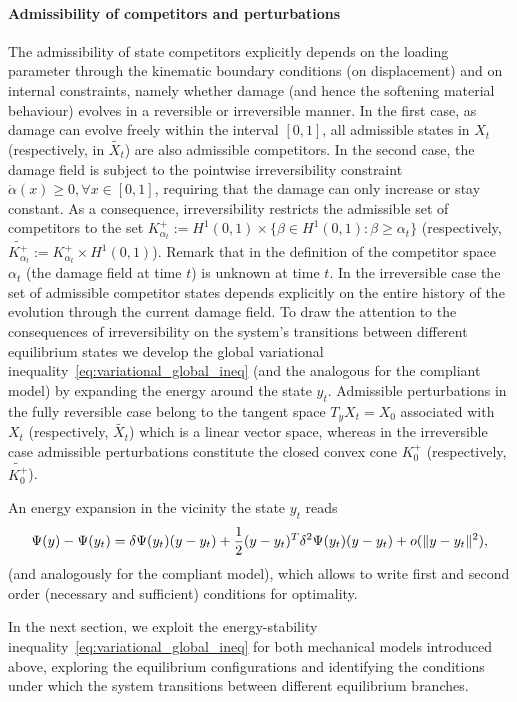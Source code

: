 \paragraph{Admissibility of competitors and perturbations}
The admissibility of state competitors explicitly depends on the loading parameter through the kinematic boundary conditions (on displacement) and on internal constraints, namely whether damage (and hence the softening material behaviour)  evolves in a reversible or irreversible manner.
In the first case, as damage can evolve freely within the interval $[0, 1]$, all admissible states in $X_t$  (respectively, in $\widetilde{X_t}$) are also admissible competitors.
In the second case, the damage field is subject to the pointwise irreversibility constraint $\dot \alpha(x)\geq 0, \forall x\in [0, 1]$, requiring that the damage can only increase or stay constant.
As a consequence, irreversibility restricts the admissible set of competitors to the set $K^+_{\alpha_t}:=H^1(0, 1) \times \{\beta\in H^1(0, 1): \beta\geq \alpha_t\}$ (respectively, $\widetilde{K^+_{\alpha_t}}:=K^+_{\alpha_t}\times H^1(0, 1)$).
Remark that in the definition of the competitor space $\alpha_t$ (the damage field at time $t$) is unknown at time $t$.
In the irreversible case the set of admissible competitor states depends explicitly on the entire history of the evolution through the current damage field.
To draw the attention to the consequences of irreversibility on the system's transitions between different equilibrium states we develop the global variational inequality~\eqref{eq:variational_global_ineq} (and the analogous for the compliant model) by expanding the energy around the state $y_t$.
Admissible perturbations in the fully reversible case belong to the {tangent} space {$T_y X_t=X_0$} associated with  $X_t$ (respectively, $\widetilde{X_t}$) {which is a linear vector space}, whereas in the irreversible case {admissible perturbations constitute} the closed convex cone $K^+_0$ (respectively, $\widetilde{K^+_0}$).

An energy expansion in the vicinity the state $y_t$ reads
$$
    \Psi(y)-\Psi(y_t)= \delta\Psi(y_t)(y-y_t)+\frac{1}{2}(y-y_t)^T \delta^2\Psi(y_t)(y-y_t)+o(\|y-y_t\|^2),
    \label{eqn:energy-expansion}
$$
(and analogously for the compliant model), which allows to write first and second order (necessary and sufficient) conditions for optimality.

In the next section, we exploit the energy-stability inequality~\eqref{eq:variational_global_ineq} for both mechanical models introduced above, exploring the equilibrium configurations and identifying the conditions under which the system transitions between different equilibrium branches.

